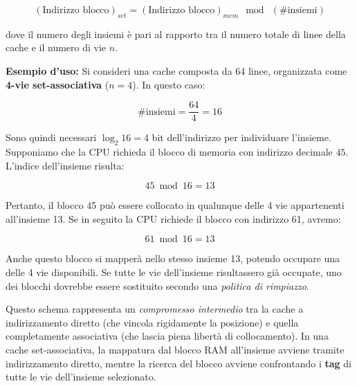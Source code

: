 \[
(\text{Indirizzo blocco})_{set} = (\text{Indirizzo blocco})_{mem} \ \bmod \ (\# \text{insiemi})
\]

\noindent
dove il numero degli insiemi è pari al rapporto tra il numero totale di linee della cache e il numero di vie $n$.  

\medskip
\noindent
\textbf{Esempio d’uso:}  
Si consideri una cache composta da 64 linee, organizzata come \textbf{4-vie set-associativa} (\(n=4\)). In questo caso:  

\[
\# \text{insiemi} = \frac{64}{4} = 16
\]

\noindent
Sono quindi necessari \(\log_2 16 = 4\) bit dell'indirizzo per individuare l'insieme.  
Supponiamo che la CPU richieda il blocco di memoria con indirizzo decimale \(45\). L'indice dell'insieme risulta:  

\[
45 \bmod 16 = 13
\]

\noindent
Pertanto, il blocco 45 può essere collocato in qualunque delle 4 vie appartenenti all'insieme 13.  
Se in seguito la CPU richiede il blocco con indirizzo 61, avremo:  

\[
61 \bmod 16 = 13
\]

\noindent Anche questo blocco si mapperà nello stesso insieme 13, potendo occupare una delle 4 vie disponibili. Se tutte le vie dell'insieme risultassero già occupate, uno dei blocchi dovrebbe essere sostituito secondo una \textit{politica di rimpiazzo}.

\noindent
Questo schema rappresenta un \textit{compromesso intermedio} tra la cache a indirizzamento diretto (che vincola rigidamente la posizione) e quella completamente associativa (che lascia piena libertà di collocamento). In una cache set-associativa, la mappatura dal blocco RAM all'insieme avviene tramite indirizzamento diretto, mentre la ricerca del blocco avviene confrontando i \textbf{tag} di tutte le vie dell'insieme selezionato.

\begin{figure}[ht]
    \centering
    \setlength{\fboxrule}{0.5pt} %
    \setlength{\fboxsep}{0pt}    %
\end{figure}

